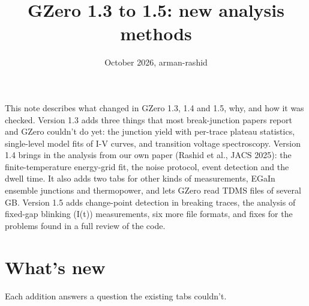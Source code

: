 \documentclass[
  11pt,
  a4paper,
]{article}
\title{GZero 1.3 to 1.5: new analysis methods}
\subtitle{October 2026, arman-rashid}
\author{}
\date{}
\begin{document}
\maketitle

This note describes what changed in GZero 1.3, 1.4 and 1.5, why, and how
it was checked. Version 1.3 adds three things that most break-junction
papers report and GZero couldn't do yet: the junction yield with
per-trace plateau statistics, single-level model fits of I-V curves, and
transition voltage spectroscopy. Version 1.4 brings in the analysis from
our own paper (Rashid et al., JACS 2025): the finite-temperature
energy-grid fit, the noise protocol, event detection and the dwell time.
It also adds two tabs for other kinds of measurements, EGaIn ensemble
junctions and thermopower, and lets GZero read TDMS files of several GB.
Version 1.5 adds change-point detection in breaking traces, the analysis
of fixed-gap blinking (I(t)) measurements, six more file formats, and
fixes for the problems found in a full review of the code.

\hypertarget{whats-new}{%
\section{What's new}\label{whats-new}}

Each addition answers a question the existing tabs couldn't.
\end{document}
